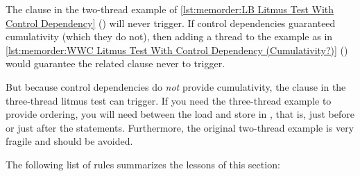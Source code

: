 \begin{listing}[tb]

\caption{LB Litmus Test With Control Dependency}
\label{lst:memorder:LB Litmus Test With Control Dependency}
\end{listing}

The  clause in the two-thread example of
\cref{lst:memorder:LB Litmus Test With Control Dependency}
()
will never trigger.
If control dependencies guaranteed cumulativity (which they do
not), then adding a thread to the example as in
\cref{lst:memorder:WWC Litmus Test With Control Dependency (Cumulativity?)}
()
would guarantee the related  clause never to trigger.

\begin{listing}

\caption{WWC Litmus Test With Control Dependency (Cumulativity?)}
\label{lst:memorder:WWC Litmus Test With Control Dependency (Cumulativity?)}
\end{listing}

But because control dependencies do \emph{not} provide cumulativity, the
 clause in the three-thread litmus test can trigger.
If you need the three-thread example to provide ordering, you will need
 between the load and store in ,
that is, just before or just after the  statements.
Furthermore, the original two-thread example is very fragile and should be avoided.

\QuickQuizEnd

The following list of rules summarizes the lessons of this section:

